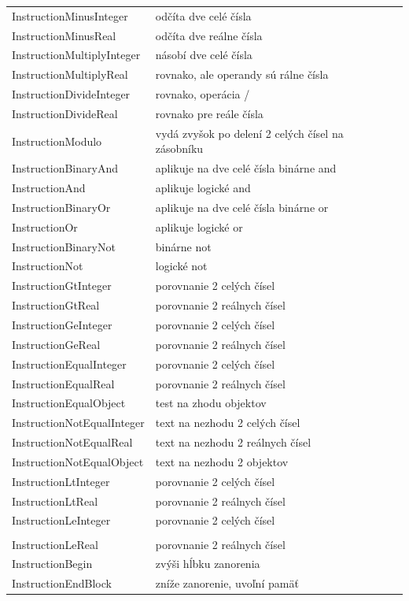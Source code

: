\begin{center}
\begin{longtable}{|l|l|l|}
InstructionMinusInteger& odčíta dve celé čísla\\
InstructionMinusReal& odčíta dve reálne čísla\\
InstructionMultiplyInteger& násobí dve celé čísla\\
InstructionMultiplyReal& rovnako, ale operandy sú rálne čísla\\
InstructionDivideInteger& rovnako, operácia /\\
InstructionDivideReal& rovnako pre reále čísla\\
InstructionModulo& vydá zvyšok po delení 2 celých čísel na zásobníku\\
InstructionBinaryAnd& aplikuje na dve celé čísla binárne and\\
InstructionAnd& aplikuje logické and \\
InstructionBinaryOr&aplikuje na dve celé čísla binárne or\\
InstructionOr& aplikuje logické or\\
InstructionBinaryNot& binárne not\\
InstructionNot& logické not\\
InstructionGtInteger& porovnanie 2 celých čísel\\
InstructionGtReal&porovnanie 2 reálnych čísel\\
InstructionGeInteger&porovnanie 2 celých čísel\\
InstructionGeReal&porovnanie 2 reálnych čísel\\
InstructionEqualInteger&porovnanie 2 celých čísel\\
InstructionEqualReal&porovnanie 2 reálnych čísel\\
InstructionEqualObject&test na zhodu objektov\\
InstructionNotEqualInteger&text na nezhodu 2 celých čísel\\
InstructionNotEqualReal&text na nezhodu 2 reálnych čísel\\
InstructionNotEqualObject&text na nezhodu 2 objektov\\
InstructionLtInteger&porovnanie 2 celých čísel\\
InstructionLtReal&porovnanie 2 reálnych čísel\\
InstructionLeInteger&porovnanie 2 celých čísel\\\\
InstructionLeReal&porovnanie 2 reálnych čísel\\
InstructionBegin& zvýši hĺbku zanorenia\\
InstructionEndBlock& zníže zanorenie, uvoľní pamäť\\

\end{longtable}
\end{center}

